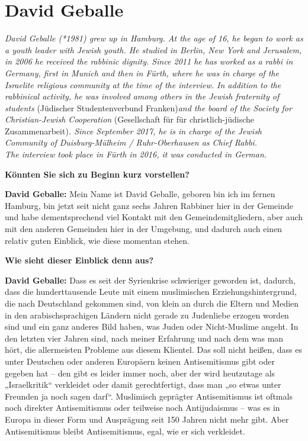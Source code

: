 \section{David Geballe} 

\textit{David Geballe (*1981) grew up in Hamburg. At the age of 16, he began to work as a youth leader with Jewish youth. He studied in Berlin, New York and Jerusalem, in 2006 he received the rabbinic dignity. Since 2011 he has worked as a rabbi in Germany, first in Munich and then in Fürth, where he was in charge of the Israelite religious community at the time of the interview. In addition to the rabbinical activity, he was involved among others in the Jewish fraternity of students }(Jüdischer Studentenverbund Franken)\textit{and the board of the Society for Christian-Jewish Cooperation }(Gesellschaft für für christlich-jüdische Zusammenarbeit)\textit{. Since September 2017, he is in charge of the Jewish Community of Duisburg-Mülheim / Ruhr-Oberhausen as Chief Rabbi.\\
The interview took place in Fürth in 2016, it was conducted in German.}\par
\vspace*{2em}
\textbf{Könnten Sie sich zu Beginn kurz vorstellen?} 

\textbf{David Geballe:} Mein Name ist David Geballe, geboren bin ich im fernen Hamburg, bin jetzt seit nicht ganz sechs Jahren Rabbiner hier in der Gemeinde und habe dementsprechend viel Kontakt mit den Gemeindemitgliedern, aber auch mit den anderen Gemeinden hier in der Umgebung, und dadurch auch einen relativ guten Einblick, wie diese momentan stehen. 

\textbf{Wie sieht dieser Einblick denn aus?} 

\textbf{David Geballe:} Dass es seit der Syrienkrise schwieriger geworden ist, dadurch, dass die hunderttausende Leute mit einem muslimischen Erziehungshintergrund, die nach Deutschland gekommen sind, von klein an durch die Eltern und Medien in den arabischsprachigen Ländern nicht gerade zu Judenliebe erzogen worden sind und ein ganz anderes Bild haben, was Juden oder Nicht-Muslime angeht. In den letzten vier Jahren sind, nach meiner Erfahrung und nach dem was man hört, die allermeisten Probleme aus diesem Klientel. Das soll nicht heißen, dass es unter Deutschen oder anderen Europäern keinen Antisemitismus gibt oder gegeben hat – den gibt es leider immer noch, aber der wird heutzutage als „Israelkritik“ verkleidet oder damit gerechtfertigt, dass man „so etwas unter Freunden ja noch sagen darf“. Muslimisch geprägter Antisemitismus ist oftmals noch direkter Antisemitismus oder teilweise noch Antijudaismus – was es in Europa in dieser Form und Ausprägung seit 150 Jahren nicht mehr gibt. Aber Antisemitismus bleibt Antisemitismus, egal, wie er sich verkleidet. 

